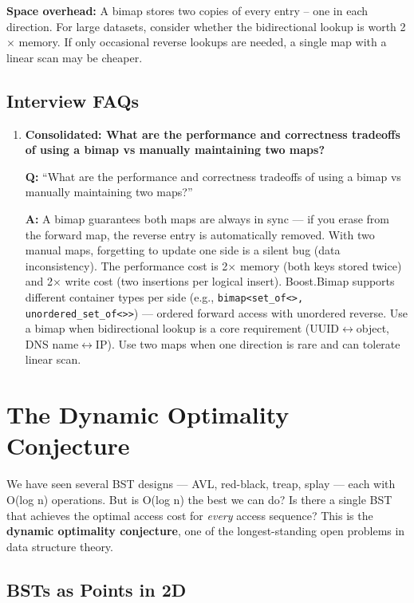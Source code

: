 \textbf{Space overhead:} A bimap stores two copies of every entry -- one in each direction. For large datasets, consider whether the bidirectional lookup is worth 2$\times$ memory. If only occasional reverse lookups are needed, a single map with a linear scan may be cheaper.

\subsection{Interview FAQs}

\begin{enumerate}
\item \textbf{Consolidated: What are the performance and correctness tradeoffs of using a bimap vs manually maintaining two maps?}

\textbf{Q:} ``What are the performance and correctness tradeoffs of using a bimap vs manually maintaining two maps?''

\textbf{A:} A bimap guarantees both maps are always in sync --- if you erase from the forward map, the reverse entry is automatically removed. With two manual maps, forgetting to update one side is a silent bug (data inconsistency). The performance cost is 2$\times$ memory (both keys stored twice) and 2$\times$ write cost (two insertions per logical insert). Boost.Bimap supports different container types per side (e.g., \texttt{bimap<set\_of<>, unordered\_set\_of<>>}) --- ordered forward access with unordered reverse. Use a bimap when bidirectional lookup is a core requirement (UUID$\leftrightarrow$object, DNS name$\leftrightarrow$IP). Use two maps when one direction is rare and can tolerate linear scan.
\end{enumerate}

\section{The Dynamic Optimality Conjecture}

We have seen several BST designs --- AVL, red-black, treap, splay --- each with O(log n) operations. But is O(log n) the best we can do? Is there a single BST that achieves the optimal access cost for \textit{every} access sequence? This is the \textbf{dynamic optimality conjecture}, one of the longest-standing open problems in data structure theory.

\subsection{BSTs as Points in 2D}

